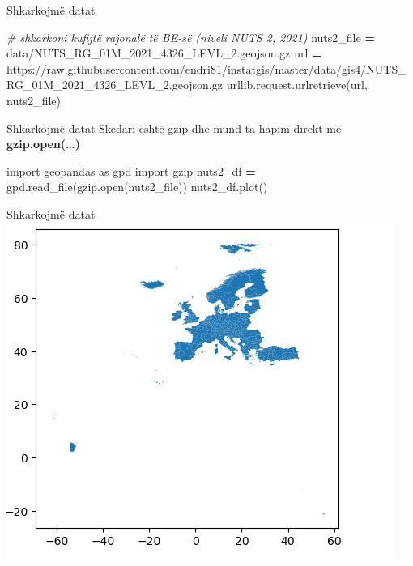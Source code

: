 \documentclass[
  ignorenonframetext,
]{beamer}
\newenvironment{Shaded}{\begin{snugshade}}{\end{snugshade}}
\newcommand{\BuiltInTok}[1]{#1}
\newcommand{\CommentTok}[1]{\textcolor[rgb]{0.56,0.35,0.01}{\textit{#1}}}
\newcommand{\ImportTok}[1]{#1}
\newcommand{\NormalTok}[1]{#1}
\newcommand{\OperatorTok}[1]{\textcolor[rgb]{0.81,0.36,0.00}{\textbf{#1}}}
\newcommand{\StringTok}[1]{\textcolor[rgb]{0.31,0.60,0.02}{#1}}
\begin{document}
\begin{frame}[fragile]{Shkarkojmë datat}
\protect\hypertarget{shkarkojmuxeb-datat}{}

\begin{Shaded}
\begin{Highlighting}[]
\CommentTok{\# shkarkoni kufijtë rajonalë të BE{-}së (niveli NUTS 2, 2021)}
\NormalTok{nuts2\_file }\OperatorTok{=} \StringTok{\textquotesingle{}data/NUTS\_RG\_01M\_2021\_4326\_LEVL\_2.geojson.gz\textquotesingle{}}
\NormalTok{url }\OperatorTok{=} \StringTok{\textquotesingle{}https://raw.githubusercontent.com/endri81/instatgis/master/data/gis4/NUTS\_RG\_01M\_2021\_4326\_LEVL\_2.geojson.gz\textquotesingle{}}
\NormalTok{urllib.request.urlretrieve(url, nuts2\_file)}
\end{Highlighting}
\end{Shaded}
\end{frame}

\begin{frame}[fragile]{Shkarkojmë datat}
\protect\hypertarget{shkarkojmuxeb-datat-1}{}
Skedari është gzip dhe mund ta hapim direkt me
\textbf{gzip.open(\ldots)}


\begin{Shaded}
\begin{Highlighting}[]
\ImportTok{import}\NormalTok{ geopandas }\ImportTok{as}\NormalTok{ gpd}
\ImportTok{import}\NormalTok{ gzip}
\NormalTok{nuts2\_df }\OperatorTok{=}\NormalTok{ gpd.read\_file(gzip.}\BuiltInTok{open}\NormalTok{(nuts2\_file))}
\NormalTok{nuts2\_df.plot()}
\end{Highlighting}
\end{Shaded}
\end{frame}

\begin{frame}{Shkarkojmë datat}
\protect\hypertarget{shkarkojmuxeb-datat-2}{}
\includegraphics{./Figs/gzip.png}
\end{frame}
\end{document}
